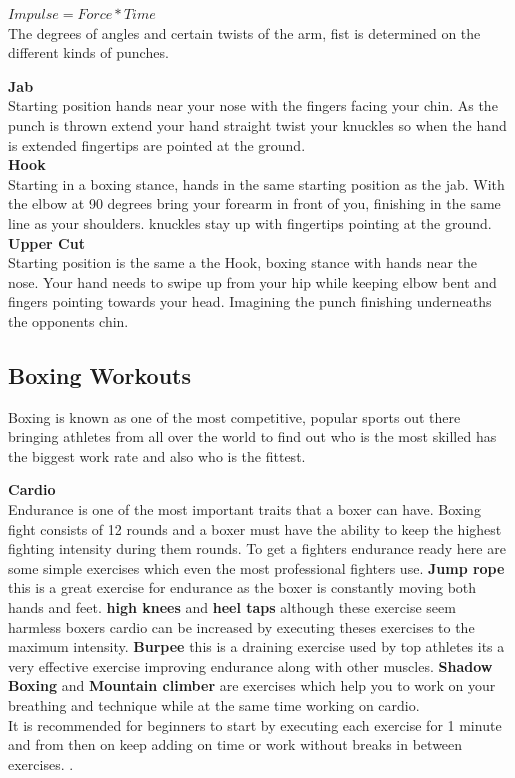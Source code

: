 \documentclass[a4paper,12pt]{report}
\begin{document}
$Impulse = Force * Time$ \cite{boxingPhysics}\\

The degrees of angles and certain twists of the arm, fist is determined on the different kinds of punches.

\textbf{Jab}\\
Starting position hands near your nose with the fingers facing your chin.
As the punch is thrown extend your hand straight twist your knuckles so when the hand is extended fingertips are pointed at the ground.\\

\textbf{Hook}\\
Starting in a boxing stance, hands in the same starting position as the jab.
With the elbow at 90 degrees bring your forearm in front of you, finishing in the same line as your shoulders. 
knuckles stay up with fingertips pointing at the ground.\\

\textbf{Upper Cut}\\
Starting position is the same a the Hook, boxing stance with hands near the nose. 
Your hand needs to swipe up from your hip while keeping elbow bent and fingers pointing towards your head. Imagining the punch finishing underneaths the opponents chin.\cite{punchingPhysics}


\subsection{Boxing Workouts}
Boxing is known as one of the most competitive, popular sports out there bringing athletes from all over the world to find out who is the most skilled has the biggest work rate and also who is the fittest.

\textbf{Cardio}\\
Endurance is one of the most important traits that a boxer can have. Boxing fight consists of 12 rounds and a boxer must have the ability to keep the highest fighting intensity during them rounds.
To get  a fighters endurance ready here are some simple exercises which even the most professional fighters use.
\textbf{Jump rope} this is a great exercise for endurance as the boxer is constantly moving both hands and feet. \textbf{high knees} and \textbf{heel taps} although these exercise seem harmless boxers cardio can be increased by executing theses exercises to the maximum intensity. \textbf{Burpee} this is a draining exercise used by top athletes its a very effective exercise improving endurance along with other muscles. \textbf{Shadow Boxing} and \textbf{Mountain climber} are exercises which help you to work on your breathing and technique while at the same time working on cardio.\\
It is recommended for beginners to start by executing each exercise for 1 minute and from then on keep adding on time or work without breaks in between exercises. \cite{cardioWorkout}.\\
\end{document}
